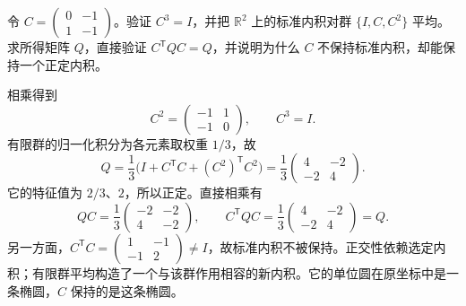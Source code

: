 \begin{exercise}\label{g1:ex:finite-nonorthogonal-average}
	令 \(C=\left(\begin{smallmatrix}0&-1\\1&-1\end{smallmatrix}\right)\)。验证 \(C^3=I\)，并把 \(\mathbb R^2\) 上的标准内积对群 \(\{I,C,C^2\}\) 平均。求所得矩阵 \(Q\)，直接验证 \(C^{\mathsf T}QC=Q\)，并说明为什么 \(C\) 不保持标准内积，却能保持一个正定内积。
\end{exercise}
\begin{solution}
	相乘得到
	\[
		C^2=\begin{pmatrix}-1&1\\-1&0\end{pmatrix},\qquad C^3=I.
	\]
	有限群的归一化积分为各元素取权重 \(1/3\)，故
	\[
		Q=\frac13\bigl(I+C^{\mathsf T}C+(C^2)^{\mathsf T}C^2\bigr)
		=\frac13\begin{pmatrix}4&-2\\-2&4\end{pmatrix}.
	\]
	它的特征值为 \(2/3\)、\(2\)，所以正定。直接相乘有
	\[
		QC=\frac13\begin{pmatrix}-2&-2\\4&-2\end{pmatrix},\qquad
		C^{\mathsf T}QC=\frac13\begin{pmatrix}4&-2\\-2&4\end{pmatrix}=Q.
	\]
	另一方面，\(C^{\mathsf T}C=\left(\begin{smallmatrix}1&-1\\-1&2\end{smallmatrix}\right)\ne I\)，故标准内积不被保持。正交性依赖选定内积；有限群平均构造了一个与该群作用相容的新内积。它的单位圆在原坐标中是一条椭圆，\(C\) 保持的是这条椭圆。
\end{solution}

